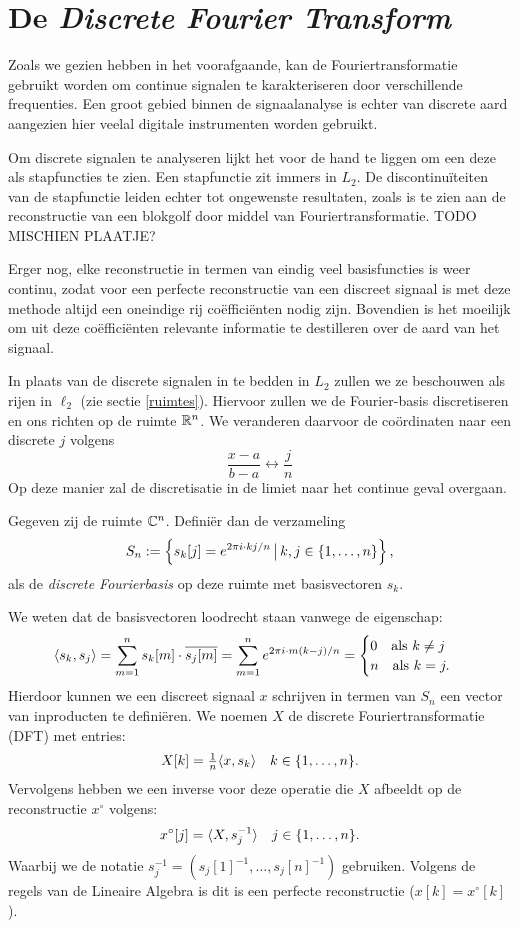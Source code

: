\section{De \emph{Discrete Fourier Transform}}
Zoals we gezien hebben in het voorafgaande, kan de Fouriertransformatie gebruikt worden om continue signalen te karakteriseren door verschillende frequenties. Een groot gebied binnen de signaalanalyse is echter van discrete aard aangezien hier veelal digitale instrumenten worden gebruikt.

Om discrete signalen te analyseren lijkt het voor de hand te liggen om een deze als stapfuncties te zien. Een stapfunctie zit immers in $L_2$. De discontinu\"iteiten van de stapfunctie leiden echter tot ongewenste resultaten, zoals is te zien aan de reconstructie van een blokgolf door middel van Fouriertransformatie. TODO MISCHIEN PLAATJE?

Erger nog, elke reconstructie in termen van eindig veel basisfuncties is weer continu, zodat voor een perfecte reconstructie van een discreet signaal is met deze methode altijd een oneindige rij co\"effici\"enten nodig zijn. Bovendien is het moeilijk om uit deze co\"effici\"enten relevante informatie te destilleren over de aard van het signaal.

In plaats van de discrete signalen in te bedden in $L_2$ zullen we ze beschouwen als rijen in $\ell_2$ (zie sectie \ref{ruimtes}).
Hiervoor zullen we de Fourier-basis discretiseren en ons richten op de ruimte $\mathbb{R}^n$.
We veranderen daarvoor de co\"ordinaten naar een discrete $j$ volgens
\[
\frac{x-a}{b-a} \leftrightarrow \frac j n 
\]
Op deze manier zal de discretisatie in de limiet naar het continue geval overgaan. 

\begin{definitie} Gegeven zij de ruimte $\mathbb{C}^n$. Defini\"er dan de verzameling
\[
  S_n := \left\{ s_k [j] = e^{{2\pi i}\cdot k j/n } \,\big|\, k,j \in \{1, \ldots, n\} \right\},
\]
als de \emph{discrete Fourierbasis} op deze ruimte met basisvectoren $s_k$.
\end{definitie}
We weten dat de basisvectoren loodrecht staan vanwege de eigenschap:
\[
  \langle s_k , s_j \rangle = 
  \sum_{m=1}^n s_k[m]\cdot \overline{s_j[m]} = 
  \sum_{m=1}^n e^{{2\pi i}\cdot m (k-j)/n} =
  \begin{cases}
    0 \quad \text{als } k\neq j\\
    n \quad \text{als } k = j.
  \end{cases}
\]
Hierdoor kunnen we een discreet signaal $x$ schrijven in termen van $S_n$ 
een vector van inproducten te defini\"eren.
We noemen $X$ de discrete Fouriertransformatie (DFT) met entries:
\[
  X[k] = \tfrac{1}{n} \langle x , s_k \rangle \quad k\in\{1, \ldots ,n\}.
\]
Vervolgens hebben we een inverse voor deze operatie die $X$ afbeeldt op de reconstructie $x^\circ$ volgens:
\[
  x^\circ[j] = \langle X , s_j^{-1} \rangle \quad j\in \{1, \ldots, n\}.
\]
Waarbij we de notatie $s_j^{-1} = (s_j[1]^{-1},\ldots, s_j[n]^{-1})$ gebruiken.
Volgens de regels van de Lineaire Algebra is dit is een perfecte reconstructie ($x[k] = x^\circ[k]$).

